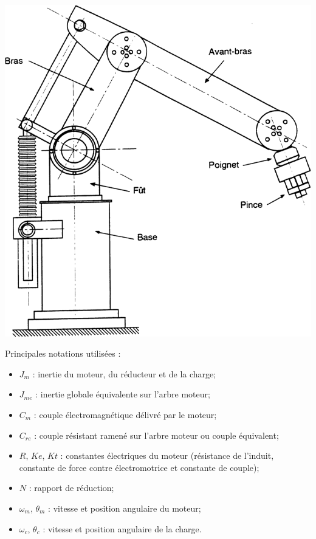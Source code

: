 \documentclass[11pt,oneside]{article}
\begin{document}
\begin{minipage}[c]{.3\linewidth}
\begin{center}
\includegraphics[width=\textwidth]{png/fig_01}
\end{center}
\end{minipage} \hfill
\begin{minipage}[c]{.65\linewidth}
Principales notations utilisées : 
\begin{itemize}
\item $J_m$ : inertie du moteur, du réducteur et de la charge;
\item $J_{me}$ : inertie globale équivalente sur l’arbre moteur;
\item $C_m$ : couple électromagnétique délivré par le moteur;
\item $C_{re}$ : couple résistant ramené sur l’arbre moteur ou couple équivalent;
\item $R$, $Ke$, $Kt$ : constantes électriques du moteur (résistance de l’induit, constante 	de force contre électromotrice et constante de couple);
\item $N$ : rapport de réduction;
\item $\omega_m$, $\theta_m$ : vitesse et position angulaire du moteur;
\item $\omega_c$, $\theta_c$ : vitesse et position angulaire de la charge.
\end{itemize}
\end{minipage}
\end{document}
